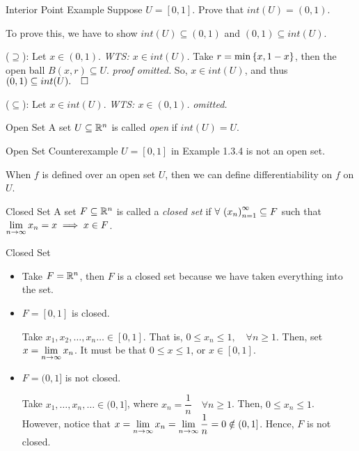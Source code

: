 \begin{eg}{Interior Point Example}
	Suppose $U=[0,1]$. Prove that $int(U)=(0,1)$.
	\begin{prf}
		To prove this, we have to show $int(U)\subseteq(0,1)$ and $(0,1)\subseteq int(U)$.\par 
		($\supseteq$): Let $x\in(0,1)$. \textit{WTS: $x\in int(U)$.} Take $r=\min\qty{x,1-x}$, then the open ball $B(x,r)\subseteq U$. \textit{proof omitted. } So, $x\in int(U)$, and thus $(0,1)\subseteq int(U). \quad\square$\par 
		($\subseteq$): Let $x\in int(U)$. \textit{WTS: $x\in(0,1)$.} \textit{omitted.}
	\end{prf}
\end{eg}
\begin{df}{Open Set}
	A set $U\subseteq{\mathbb{R}}^n$ is called \textit{open} if $int(U)=U$.	
\end{df}
\begin{eg}{Open Set Counterexample}
	$U=[0,1]$ in Example 1.3.4 is not an open set.	
\end{eg}
\begin{rmk}
	When $f$ is defined over an open set $U$, then we can define differentiability on $f$ on $U$.
\end{rmk}
\begin{df}{Closed Set}
	A set $F\subseteq{\mathbb{R}}^n$ is called a \textit{closed set} if $\forall\ \qty(x_n)_{n=1}^\infty\subseteq F$ such that $\displaystyle\lim_{n\to\infty}x_n=x\implies x\in F$.
\end{df}
\begin{eg}{Closed Set}
	\begin{itemize}
		\item Take $F={\mathbb{R}}^n$, then $F$ is a closed set because we have taken everything into the set.
		\item $F=[0,1]$ is closed.
		\begin{prf}
			Take $x_1,x_2,\dots,x_n\dots\in[0,1]$. That is, $0\leq x_n\leq1,\quad\forall n\geq1$. Then, set $x=\displaystyle\lim_{n\to\infty}x_n$. It must be that $0\leq x\leq 1$, or $x\in[0, 1]$.
		\end{prf}
		\item $F=(0,1]$ is not closed.
		\begin{prf}
			Take $x_1,\dots,x_n,\dots\in(0,1]$, where $x_n=\dfrac{1}{n}\quad\forall n\geq1$. Then, $0\leq x_n\leq1$. However, notice that $x=\displaystyle\lim_{n\to\infty}x_n=\lim_{n\to\infty}\dfrac{1}{n}=0\notin(0,1]$. Hence, $F$ is not closed. 
		\end{prf}
	\end{itemize}	
\end{eg}
